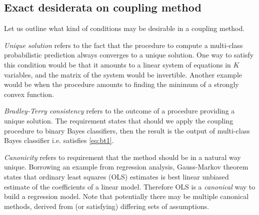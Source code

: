 \documentclass[twoside,11pt]{article}
\begin{document}
\subsection{Exact desiderata on coupling method}

Let us outline what kind of conditions may be desirable in a coupling method.

%



\emph{Unique solution} refers to the fact that the procedure to compute a multi-class probabilistic prediction always converges to a unique solution. One way to satisfy this condition would be that it amounts to a linear system of equations in $K$ variables, and the matrix of the system would be invertible. Another example would be when the procedure amounts to finding the minimum of a strongly convex function. 

\emph{Bradley-Terry consistency} refers to the outcome of a procedure providing a unique solution. The requirement states that should we apply the coupling procedure to binary Bayes classifiers, then the result is the output of multi-class Bayes classifier i.e. satisfies \eqref{eq:bt1}.

\emph{Canonicity} refers to requirement that the method should be in a natural way unique. Borrowing an example from regression analysis, Gauss-Markov theorem states that ordinary least squares (OLS) estimates is best linear unbiased estimate of the coefficients of a linear model. Therefore OLS  is a \emph{canonical} way to build a regression model. Note that potentially there may be multiple canonical methods, derived from (or satisfying) differing sets of assumptions. 
\end{document}
